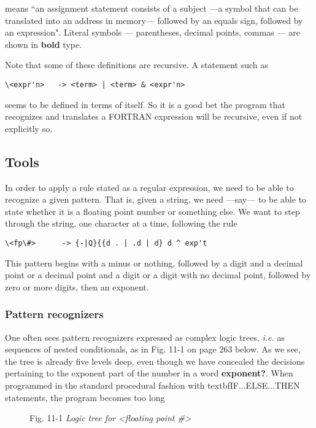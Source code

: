means “an assignment statement consists of a subject ---a symbol that can be translated into an address in memory--- followed by an equals sign, followed by an expression". Literal symbols --- parentheses, decimal points, commas --- are shown in \textbf{bold} type.

Note that some of these definitions are recursive. A statement such as

\begin{verbatim}
\<expr'n>   -> <term> | <term> & <expr'n>
\end{verbatim}

seems to be defined in terms of itself. So it is a good bet the program that recognizes and translates a FORTRAN expression will be recursive, even if not explicitly so.

\subsection{Tools}

In order to apply a rule stated as a regular expression, we need to be able to recognize a given pattern. That is, given a string, we need —say— to be able to state whether it is a floating point number or something else. We want to step through the string, one character at a time, following the rule

\begin{verbatim}
\<fp\#>      -> {-|Q}{{d . | .d | d} d ^ exp't
\end{verbatim}

This pattern begins with a minus or nothing, followed by a digit and a decimal point or a decimal point and a digit or a digit with no decimal point, followed by zero or more digits, then an exponent.

\subsubsection{Pattern recognizers}

One often sees pattern recognizers expressed as complex logic trees, \textit{i.e.} as sequences of nested conditionals, as in Fig. 11-1 on page 263 below. As we see, the tree is already five levels deep, even though we have concealed the decisions pertaining to the exponent part of the number in a word \textbf{exponent?}. When programmed in the standard procedural fashion with textbf{IF...ELSE...THEN} statements, the program becomes too long

\begin{figure}
    \caption{Fig. 11-1 \textit{Logic tree for <floating point \#>}}
\end{figure}

